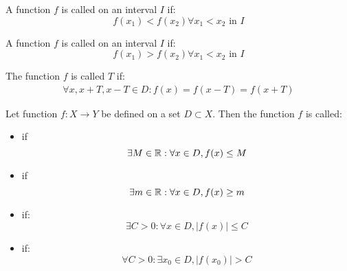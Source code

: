             \par A function $f$ is called  on an interval $I$ if:
            \begin{equation}
                f(x_{1}) < f(x_{2}) \forall x_{1} < x_{2} \mbox{ in } I
            \end{equation}
            \par A function $f$ is called  on an interval $I$ if:
            \begin{equation}
                f(x_{1}) > f(x_{2}) \forall x_{1} < x_{2} \mbox{ in } I
            \end{equation}
    \hiiEND

        \par The function $f$ is called  $T$ if:
        \begin{align}
            \forall x, x + T, x - T \in D: f(x) = f(x - T) = f(x + T)
        \end{align}

        \par Let function $f: X \to Y$ be defined on a set $D \subset X$. Then the function
        $f$ is called:
        \begin{itemize}
            \item {} if
                \begin{equation}
                    \exists M \in \mathbb{R}: \forall x \in D, f(x) \leq M
                \end{equation}
            \item {} if
                \begin{equation}
                    \exists m \in \mathbb{R}: \forall x \in D, f(x) \geq m
                \end{equation}
            \item {} if:
                \begin{equation}
                    \exists C > 0: \forall x \in D, |f(x)| \leq C
                \end{equation}
            \item {} if:
                \begin{equation}
                    \forall C > 0: \exists x_{0} \in D, |f(x_{0})| > C
                \end{equation}
        \end{itemize}

